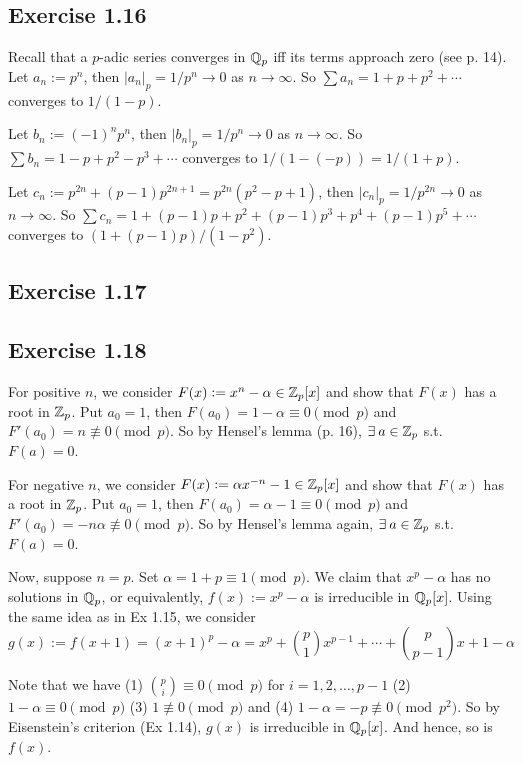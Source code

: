 \documentclass[../Koblitz.tex]{subfiles}
\begin{document}
\subsection*{Exercise 1.16}

Recall that a $p$-adic series converges in $\mathbb{Q}_p$ iff its terms approach zero (see p. 14). Let $a_n:=p^n$, then $|a_n|_p=1/p^n\to0$ as $n\to\infty$. So $\sum a_n=1+p+p^2+\cdots$ converges to $1/(1-p)$.

Let $b_n:=(-1)^np^n$, then $|b_n|_p=1/p^n\to0$ as $n\to\infty$. So $\sum b_n=1-p+p^2-p^3+\cdots$ converges to $1/(1-(-p))=1/(1+p)$.

Let $c_n:=p^{2n}+(p-1)p^{2n+1}=p^{2n}(p^2-p+1)$, then $|c_n|_p=1/p^{2n}\to0$ as $n\to\infty$. So $\sum c_n=1+(p-1)p+p^2+(p-1)p^3+p^4+(p-1)p^5+\cdots$ converges to $(1+(p-1)p)/(1-p^2)$.

\subsection*{Exercise 1.17}

\subsection*{Exercise 1.18}

For positive $n$, we consider $F(x):=x^n-\alpha\in\mathbb{Z}_p[x]$ and show that $F(x)$ has a root in $\mathbb{Z}_p$. Put $a_0=1$, then $F(a_0)=1-\alpha\equiv 0\pmod{p}$ and $F'(a_0)=n\not\equiv 0\pmod{p}$. So by Hensel's lemma (p. 16), $\exists a\in\ZZ_p$ s.t. $F(a)=0$.

For negative $n$, we consider $F(x):=\alpha x^{-n}-1\in\mathbb{Z}_p[x]$ and show that $F(x)$ has a root in $\mathbb{Z}_p$. Put $a_0=1$, then $F(a_0)=\alpha-1\equiv 0\pmod{p}$ and $F'(a_0)=-n\alpha\not\equiv 0\pmod{p}$. So by Hensel's lemma again, $\exists a\in\ZZ_p$ s.t. $F(a)=0$.

Now, suppose $n=p$. Set $\alpha=1+p\equiv1\pmod{p}$. We claim that $x^p-\alpha$ has no solutions in $\mathbb{Q}_p$, or equivalently, $f(x):=x^p-\alpha$ is irreducible in $\mathbb{Q}_p[x]$. Using the same idea as in Ex 1.15, we consider $$g(x):=f(x+1)=(x+1)^p-\alpha = x^p+\binom{p}{1}x^{p-1}+\cdots+\binom{p}{p-1}x+1-\alpha$$

Note that we have (1) $\binom{p}{i}\equiv 0\pmod{p}$ for $i=1,2,\ldots,p-1$ (2) $1-\alpha\equiv 0\pmod{p}$ (3) $1\not\equiv 0\pmod{p}$ and (4) $1-\alpha=-p\not\equiv0\pmod{p^2}$. So by Eisenstein's criterion (Ex 1.14), $g(x)$ is irreducible in $\mathbb{Q}_p[x]$. And hence, so is $f(x)$.
\end{document}
